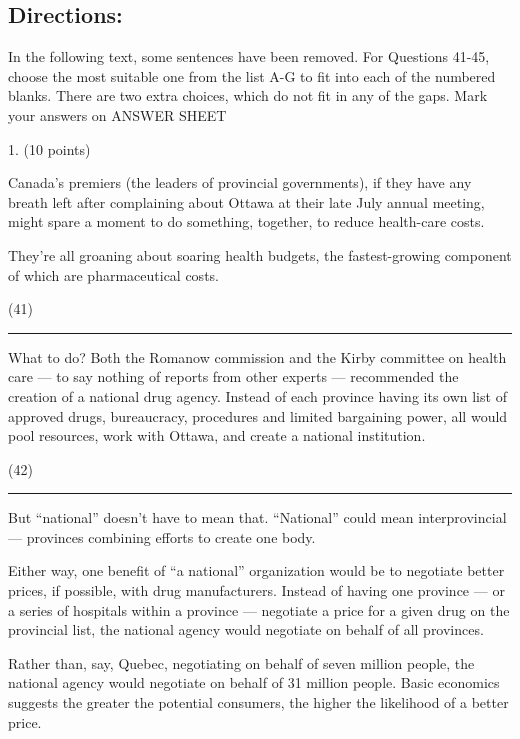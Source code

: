 \documentclass[UTF8,11pt]{ctexart}
\begin{document}
\subsection*{\textbf{Directions:}}


In the following text, some sentences have been removed. For Questions 41-45, choose the most suitable one from the list A-G to fit into each of the numbered blanks. There are two extra choices, which do not fit in any of the gaps. Mark your answers on ANSWER SHEET


1. (10 points)


Canada’s premiers (the leaders of provincial governments), if they have any breath left after complaining about Ottawa at their late July annual meeting, might spare a moment to do something, together, to reduce health-care costs.


They’re all groaning about soaring health budgets, the fastest-growing component of which are pharmaceutical costs.


(41)\par\noindent\rule{.95\linewidth}{.4pt}\par


What to do? Both the Romanow commission and the Kirby committee on health care — to say nothing of reports from other experts — recommended the creation of a national drug agency. Instead of each province having its own list of approved drugs, bureaucracy, procedures and limited bargaining power, all would pool resources, work with Ottawa, and create a national institution.


(42)\par\noindent\rule{.95\linewidth}{.4pt}\par


But “national” doesn’t have to mean that. “National” could mean interprovincial — provinces combining efforts to create one body.


Either way, one benefit of “a national” organization would be to negotiate better prices, if possible, with drug manufacturers. Instead of having one province — or a series of hospitals within a province — negotiate a price for a given drug on the provincial list, the national agency would negotiate on behalf of all provinces.


Rather than, say, Quebec, negotiating on behalf of seven million people, the national agency would negotiate on behalf of 31 million people. Basic economics suggests the greater the potential consumers, the higher the likelihood of a better price.
\end{document}
